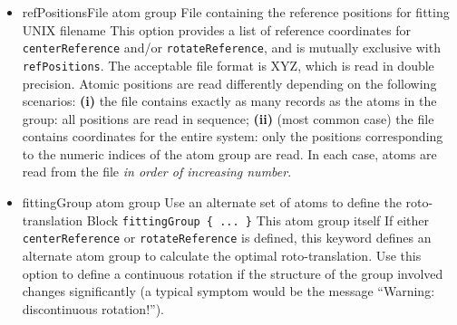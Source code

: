 \begin{itemize}
\item %
  \key
    {refPositionsFile}{%
    atom group}{%
    File containing the reference positions for fitting}{%
    UNIX filename}{%
    \label{key:colvars:atom_group:refPositionsFile}
    This option provides a list of reference coordinates for \texttt{centerReference} and/or \texttt{rotateReference}, and is mutually exclusive with \texttt{refPositions}.
    The acceptable file format is XYZ, which is read in double precision.
    Atomic positions are read differently depending on the following scenarios:
    \textbf{(i)} the file contains exactly as many records as the atoms in the group: all positions are read in sequence;
    \textbf{(ii)} (most common case) the file contains coordinates for the entire system: only the positions corresponding to the numeric indices of the atom group are read.
    In each case, atoms are read from the file \emph{in order of increasing number}.
}



\item %
  \keydef
    {fittingGroup}{%
    atom group}{%
    Use an alternate set of atoms to define the roto-translation}{%
    Block \texttt{fittingGroup \{ ... \}}}{%
    This atom group itself}{%
    If either \texttt{centerReference} or \texttt{rotateReference} is defined, this keyword defines an alternate atom group to calculate the optimal roto-translation.
    Use this option to define a continuous rotation if the structure of the group involved changes significantly (a typical symptom would be the message ``Warning: discontinuous rotation!'').}

\end{itemize}

